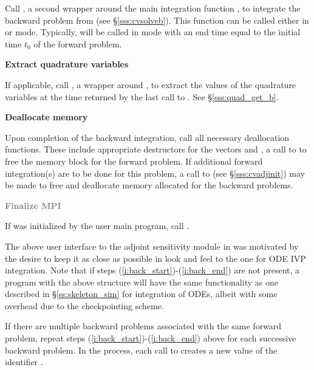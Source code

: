 \begin{Steps}
  Call , a second wrapper around the {\cvodes} main integration
  function , to integrate the backward problem from 
  (see \S\ref{sss:cvsolveb}). This function can be called either in 
  or  mode. Typically,  will be called in 
  mode with an end time equal to the initial time $t_0$ of the forward problem.

\item \label{i:back_end}
  {\bf Extract quadrature variables}

  If applicable, call , a wrapper around ,
  to extract the values of the quadrature variables at the time returned
  by the last call to . See \S\ref{sss:quad_get_b}.

\item
  {\bf Deallocate memory}

  Upon completion of the backward integration, call all necessary deallocation
  functions. These include appropriate destructors for the vectors 
   and , a call to  to free the {\cvodes} memory block 
  for the forward problem.  If additional forward integration(s) are to be done
  for this problem, a call to  (see \S\ref{sss:cvadjinit}) may be
  made to free and deallocate memory allocated for the backward problems. 

\item
  \textcolor{gray}{\bf Finalize MPI}

  {\p} If {\mpi} was initialized by the user main program, call .

\end{Steps}

The above user interface to the adjoint sensitivity module in {\cvodes} was motivated by
the desire to keep it as close as possible in look and feel to the one for ODE IVP 
integration. Note that if steps (\ref{i:back_start})-(\ref{i:back_end}) are not present, 
a program with the above structure will have the same functionality as one described in
\S\ref{ss:skeleton_sim} for integration of ODEs, albeit with some overhead due to 
the checkpointing scheme.

If there are multiple backward problems associated with the same forward problem,
repeat steps (\ref{i:back_start})-(\ref{i:back_end}) above for each successive
backward problem.  In the process, each call to  creates a new
value of the identifier .

